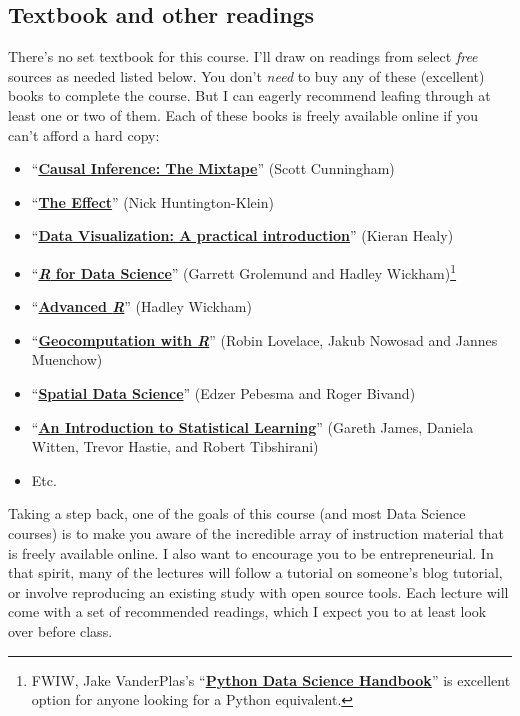 \documentclass[11pt]{article}
\begin{document}
\subsection*{Textbook and other readings}

There's no set textbook for this course. I'll draw on readings from select \textit{free} sources as needed listed below. You don't \textit{need} to buy any of these (excellent) books to complete the course. But I can eagerly recommend leafing through at least one or two of them. Each of these books is freely available online if you can't afford a hard copy:
%
\begin{itemize}
  \item ``\href{https://mixtape.scunning.com/}{\textbf{Causal Inference: The Mixtape}}'' (Scott Cunningham)
  \item  ``\href{https://theeffectbook.net/}{\textbf{The Effect}}'' (Nick Huntington-Klein)
  \item ``\href{http://socviz.co/}{\textbf{Data Visualization: A practical introduction}}'' (Kieran Healy)
	\item ``\href{https://r4ds.hadley.nz/}{\textbf{\textit{R} for Data Science}}'' (Garrett Grolemund and Hadley Wickham)\footnote{FWIW, Jake VanderPlas's ``\href{https://jakevdp.github.io/PythonDataScienceHandbook/}{\textbf{Python Data Science Handbook}}'' is excellent option for anyone looking for a Python equivalent.}
   \item ``\href{https://adv-r.hadley.nz/}{\textbf{Advanced \textit{R}}}'' (Hadley Wickham)
   \item ``\href{https://geocompr.robinlovelace.net/}{\textbf{Geocomputation with \textit{R}}}'' (Robin Lovelace, Jakub Nowosad and Jannes Muenchow)
   \item ``\href{https://keen-swartz-3146c4.netlify.app/}{\textbf{Spatial Data Science}}'' (Edzer Pebesma and Roger Bivand)
   \item ``\href{https://statlearning.com}{\textbf{An Introduction to Statistical Learning}}'' (Gareth James, Daniela Witten, Trevor Hastie, and Robert Tibshirani)
   \item Etc.
\end{itemize}

Taking a step back, one of the goals of this course (and most Data Science courses) is to make you aware of the incredible array of instruction material that is freely available online. I also want to encourage you to be entrepreneurial. In that spirit, many of the lectures will follow a tutorial on someone's blog tutorial, or involve reproducing an existing study with open source tools. Each lecture will come with a set of recommended readings, which I expect you to at least look over before class.
\end{document}
